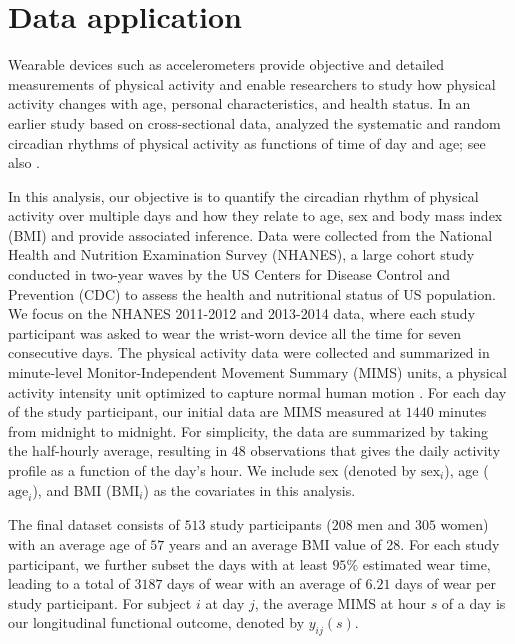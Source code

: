 \documentclass[submit]{smj}
\begin{document}
\section{Data application}\label{sec:application}


Wearable devices such as accelerometers provide objective and detailed measurements of physical activity and enable researchers to study how physical activity changes with age, personal characteristics, and health status. In an earlier study based on cross-sectional data, \cite{Xiao2015} analyzed the systematic and random circadian rhythms of physical activity as functions of time of day and age; see also \cite{Goldsmith2015}.


In this analysis, our objective is to quantify the circadian rhythm of physical activity over multiple days and how they relate to age, sex and body mass index (BMI) and provide associated inference. Data were collected from the National Health and Nutrition Examination Survey (NHANES), a large cohort study conducted in two-year waves by the US Centers for Disease Control and Prevention (CDC) to assess the health and nutritional status of US population. We focus on the NHANES 2011-2012 and 2013-2014 data, where each study participant was asked to wear the wrist-worn device all the time for seven consecutive days. The physical activity data were collected and summarized in minute-level Monitor-Independent Movement Summary (MIMS) units, a physical activity intensity unit optimized to capture normal human motion \citep{John2019}. For each day of the study participant, our initial data are MIMS measured at $1440$ minutes from midnight to midnight. For simplicity, the data are summarized by taking the half-hourly average, resulting in $48$ observations that gives the daily activity profile as a function of the day's hour. We include sex (denoted by $\text{sex}_i$), age ($\text{age}_i$), and BMI ($\text{BMI}_{i}$) as the covariates in this analysis.


The final dataset consists of $513$ study participants ($208$ men and $305$ women) with an average age of $57$ years and an average BMI value of 28. For each study participant, we further subset the days with at least $95\%$ estimated wear time, leading to a total of $3187$ days of wear with an average of $6.21$ days of wear per study participant. For subject $i$ at day $j$, the average MIMS at hour $s$ of a day is our longitudinal functional outcome, denoted by $y_{ij}(s)$. 
\end{document}
